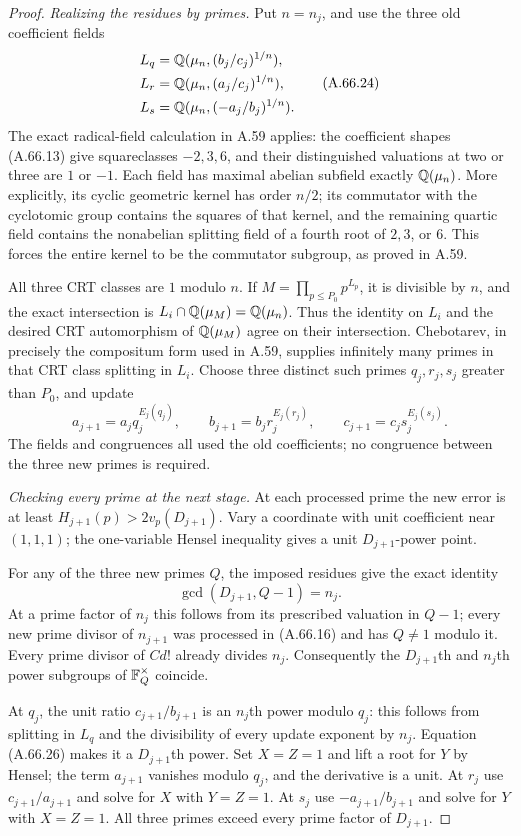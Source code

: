 \begin{proof}
\emph{Realizing the residues by primes.}
Put $n=n_j$, and use the three old coefficient fields
\[
 \begin{split}
 L_q&=\mathbb Q(\mu_n,(b_j/c_j)^{1/n}),\\
 L_r&=\mathbb Q(\mu_n,(a_j/c_j)^{1/n}),\\
 L_s&=\mathbb Q(\mu_n,(-a_j/b_j)^{1/n}).
 \end{split}
 \tag{A.66.24}
\]
The exact radical-field calculation in A.59 applies:
the coefficient shapes (A.66.13) give squareclasses
$-2,3,6$, and their distinguished valuations at two
or three are $1$ or $-1$.  Each field has maximal
abelian subfield exactly $\mathbb Q(\mu_n)$.  More explicitly,
its cyclic geometric kernel has order $n/2$; its
commutator with the cyclotomic group contains the
squares of that kernel, and the remaining quartic
field contains the nonabelian splitting field of a
fourth root of $2,3$, or $6$.  This forces the entire
kernel to be the commutator subgroup, as proved in A.59.

All three CRT classes are $1$ modulo $n$.
If $M=\prod_{p\le P_0}p^{L_p}$, it is divisible by $n$,
and the exact intersection is
$L_i\cap\mathbb Q(\mu_M)=\mathbb Q(\mu_n)$.
Thus the identity on $L_i$ and the desired CRT automorphism
of $\mathbb Q(\mu_M)$ agree on their intersection.  Chebotarev,
in precisely the compositum form used in A.59, supplies
infinitely many primes in that CRT class splitting in
$L_i$.  Choose three distinct such primes $q_j,r_j,s_j$
greater than $P_0$, and update
\[
 a_{j+1}=a_jq_j^{E_j(q_j)},\qquad
 b_{j+1}=b_jr_j^{E_j(r_j)},\qquad
 c_{j+1}=c_js_j^{E_j(s_j)}.
 \tag{A.66.25}
\]
The fields and congruences all used the old coefficients;
no congruence between the three new primes is required.

\emph{Checking every prime at the next stage.}
At each processed prime the new error is at least
$H_{j+1}(p)>2v_p(D_{j+1})$.  Vary a coordinate with
unit coefficient near $(1,1,1)$; the one-variable
Hensel inequality gives a unit $D_{j+1}$-power point.

For any of the three new primes $Q$, the imposed residues
give the exact identity
\[
                         \gcd(D_{j+1},Q-1)=n_j.
 \tag{A.66.26}
\]
At a prime factor of $n_j$ this follows from its prescribed
valuation in $Q-1$; every new prime divisor of $n_{j+1}$
was processed in (A.66.16) and has $Q\ne1$ modulo it.
Every prime divisor of $Cd!$ already divides $n_j$.
Consequently the $D_{j+1}$th and $n_j$th power subgroups
of $\mathbb F_Q^\times$ coincide.

At $q_j$, the unit ratio $c_{j+1}/b_{j+1}$ is an
$n_j$th power modulo $q_j$: this follows from splitting
in $L_q$ and the divisibility of every update exponent
by $n_j$.  Equation (A.66.26) makes it a $D_{j+1}$th
power.  Set $X=Z=1$ and lift a root for $Y$ by Hensel;
the term $a_{j+1}$ vanishes modulo $q_j$, and the
derivative is a unit.  At $r_j$ use $c_{j+1}/a_{j+1}$
and solve for $X$ with $Y=Z=1$.  At $s_j$ use
$-a_{j+1}/b_{j+1}$ and solve for $Y$ with $X=Z=1$.
All three primes exceed every prime factor of $D_{j+1}$.


\end{proof}
